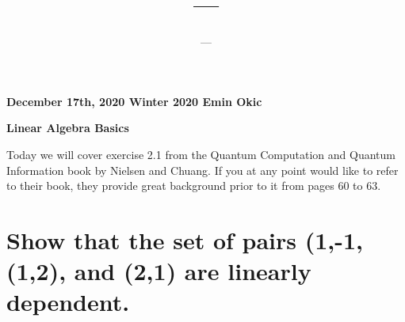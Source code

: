 \documentclass[11pt]{article}
\title{---}
\author{---}
\begin{document}
\begin{center}
{\Large \bf December 17th, 2020 \hfill Winter 2020 \hfill Emin Okic }
\end{center}


\begin{center}
{ \bf Linear Algebra Basics  }
\end{center}

\begin{text}
Today we will cover exercise 2.1 from the Quantum Computation and Quantum Information book by Nielsen and Chuang. If you at any point would like to refer to their book, they provide great background prior to it from pages 60 to 63. 
\end{text}

\section{Show that the set of pairs (1,-1, (1,2), and (2,1) are linearly dependent.}
\end{document}
